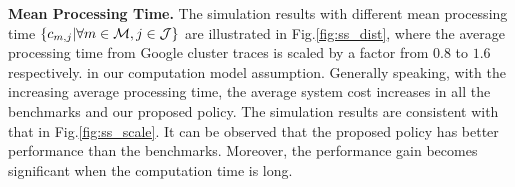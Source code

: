 \noindent\textbf{Mean Processing Time.}
The simulation results with different mean processing time $\{c_{m,j}|\forall m\in\mathcal{M},j\in\mathcal{J}\}$ are illustrated in Fig.\ref{fig:ss_dist}, where the average processing time from Google cluster traces is scaled by a factor from $0.8$ to $1.6$ respectively.
in our computation model assumption.
Generally speaking, with the increasing average processing time, the average system cost increases in all the benchmarks and our proposed policy.
The simulation results are consistent with that in Fig.\ref{fig:ss_scale}.
It can be observed that the proposed policy has better performance than the benchmarks.
Moreover, the performance gain becomes significant when the computation time is long.
